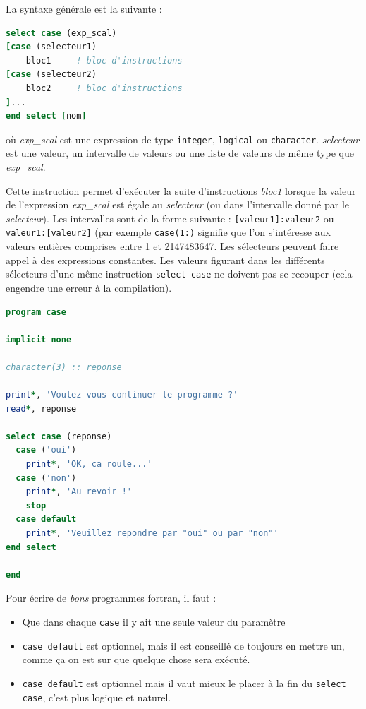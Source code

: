 \documentclass[a4paper,twoside]{article}
\begin{document}
La syntaxe générale est la suivante : 
\begin{lstlisting}[language=Fortran]
select case (exp_scal) 
[case (selecteur1)
    bloc1     ! bloc d'instructions 
[case (selecteur2)
    bloc2     ! bloc d'instructions
]... 
end select [nom]
\end{lstlisting}
où \emph{exp\_scal} est une expression de type \texttt{integer}, \texttt{logical} ou \texttt{character}. \emph{selecteur} est une valeur, un intervalle de valeurs ou une liste de valeurs de même type que \emph{exp\_scal}.

Cette instruction permet d'exécuter la suite d'instructions \emph{bloc1} lorsque la valeur de l'expression \emph{exp\_scal} est égale au \emph{selecteur} (ou dans l'intervalle donné par le \emph{selecteur}). Les intervalles sont de la forme suivante : \texttt{[valeur1]:valeur2} ou \texttt{valeur1:[valeur2]} (par exemple \texttt{case(1:)} signifie que l'on s'intéresse aux valeurs entières comprises entre 1 et 2147483647. Les sélecteurs peuvent faire appel à des expressions constantes. Les valeurs figurant dans les différents sélecteurs d'une même instruction \texttt{select case} ne doivent pas se recouper (cela engendre une erreur à la compilation).

\begin{lstlisting}[language=Fortran]
program case

implicit none

character(3) :: reponse

print*, 'Voulez-vous continuer le programme ?'
read*, reponse

select case (reponse)
  case ('oui')
    print*, 'OK, ca roule...'
  case ('non')
    print*, 'Au revoir !'
    stop
  case default
    print*, 'Veuillez repondre par "oui" ou par "non"'
end select

end
\end{lstlisting}

\begin{remarque}
Pour écrire de \emph{bons} programmes fortran, il faut : 
\begin{itemize}
\item Que dans chaque \texttt{case} il y ait une seule valeur du paramètre
\item \texttt{case default} est optionnel, mais il est conseillé de toujours en mettre un, comme ça on est sur que quelque chose sera exécuté.
\item \texttt{case default} est optionnel mais il vaut mieux le placer à la fin du \texttt{select case}, c'est plus logique et naturel.
\end{itemize}
\end{remarque}
\end{document}
